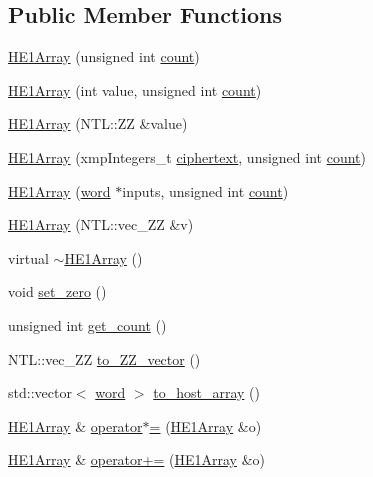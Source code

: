 \subsection*{Public Member Functions}
\begin{DoxyCompactItemize}
\item 
\hyperlink{classHE1Array_a99381587cd348b91f90a94fe5b25a3a3}{H\+E1\+Array} (unsigned int \hyperlink{classHE1Array_a486ac51b636d5434c6d456a0b470ab1e}{count})
\item 
\hyperlink{classHE1Array_a8c961c822603135c972b7fefc555f560}{H\+E1\+Array} (int value, unsigned int \hyperlink{classHE1Array_a486ac51b636d5434c6d456a0b470ab1e}{count})
\item 
\hyperlink{classHE1Array_af000ef4656e6b1136b9aaec07e683ad0}{H\+E1\+Array} (N\+T\+L\+::\+ZZ \&value)
\item 
\hyperlink{classHE1Array_aa2bc58501546488b6d05b7f14b2f8ec3}{H\+E1\+Array} (xmp\+Integers\+\_\+t \hyperlink{classCiphertext_adef9aae9d923eb100b4a1ad58ce495f1}{ciphertext}, unsigned int \hyperlink{classHE1Array_a486ac51b636d5434c6d456a0b470ab1e}{count})
\item 
\hyperlink{classHE1Array_ab07215fb33d5e7c2422ef7201752759b}{H\+E1\+Array} (\hyperlink{HE1Array_8h_a19036394f9c80a08fc846c96f668711c}{word} $\ast$inputs, unsigned int \hyperlink{classHE1Array_a486ac51b636d5434c6d456a0b470ab1e}{count})
\item 
\hyperlink{classHE1Array_a83a31561044fe24c711526bb2e137de7}{H\+E1\+Array} (N\+T\+L\+::vec\+\_\+\+ZZ \&v)
\item 
virtual \hyperlink{classHE1Array_a9aa03bcb90dfa12ed1666ef9b7825bcf}{$\sim$\+H\+E1\+Array} ()
\item 
void \hyperlink{classHE1Array_a1fb765c051988639c3d4f33b6c166035}{set\+\_\+zero} ()
\item 
unsigned int \hyperlink{classHE1Array_a87b0a1931df4e220fe3c9ae92ba2ce64}{get\+\_\+count} ()
\item 
N\+T\+L\+::vec\+\_\+\+ZZ \hyperlink{classHE1Array_a43de83bb8ed2cf9063e60acccd2031e8}{to\+\_\+\+Z\+Z\+\_\+vector} ()
\item 
std\+::vector$<$ \hyperlink{HE1Array_8h_a19036394f9c80a08fc846c96f668711c}{word} $>$ \hyperlink{classHE1Array_af689c0f38383fb15efcff72563a9187b}{to\+\_\+host\+\_\+array} ()
\item 
\hyperlink{classHE1Array}{H\+E1\+Array} \& \hyperlink{classHE1Array_ab2a255ca11e099aa6e331133302edc10}{operator$\ast$=} (\hyperlink{classHE1Array}{H\+E1\+Array} \&o)
\item 
\hyperlink{classHE1Array}{H\+E1\+Array} \& \hyperlink{classHE1Array_a3bf3040c4a13cf3b83730dcc8d01b352}{operator+=} (\hyperlink{classHE1Array}{H\+E1\+Array} \&o)
\end{DoxyCompactItemize}
